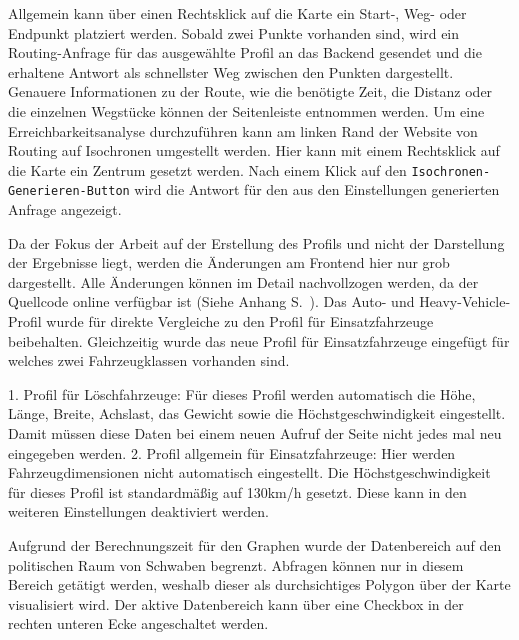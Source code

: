 Allgemein kann über einen Rechtsklick auf die Karte ein Start-, Weg- oder Endpunkt platziert werden.
Sobald zwei Punkte vorhanden sind, wird ein Routing-Anfrage für das ausgewählte Profil an das Backend gesendet und die erhaltene Antwort als schnellster Weg zwischen den Punkten dargestellt.
Genauere Informationen zu der Route, wie die benötigte Zeit, die Distanz oder die einzelnen Wegstücke können der Seitenleiste entnommen werden.
Um eine Erreichbarkeitsanalyse durchzuführen kann am linken Rand der Website von Routing auf Isochronen umgestellt werden.
Hier kann mit einem Rechtsklick auf die Karte ein Zentrum gesetzt werden.
Nach einem Klick auf den \texttt{Isochronen-Generieren-Button} wird die Antwort für den aus den Einstellungen generierten Anfrage angezeigt.

\bigskip

Da der Fokus der Arbeit auf der Erstellung des Profils und nicht der Darstellung der Ergebnisse liegt, werden die Änderungen am Frontend hier nur grob dargestellt.
Alle Änderungen können im Detail nachvollzogen werden, da der Quellcode online verfügbar ist (Siehe Anhang S.~\pageref{sec:anhang}). Das Auto- und Heavy-Vehicle-Profil wurde für direkte Vergleiche zu den Profil für Einsatzfahrzeuge beibehalten.
Gleichzeitig wurde das neue Profil für Einsatzfahrzeuge eingefügt für welches zwei Fahrzeugklassen vorhanden sind.

\bigskip

1. Profil für Löschfahrzeuge: Für dieses Profil werden automatisch die Höhe, Länge, Breite, Achslast, das Gewicht sowie die Höchstgeschwindigkeit eingestellt.
Damit müssen diese Daten bei einem neuen Aufruf der Seite nicht jedes mal neu eingegeben werden.
2. Profil allgemein für Einsatzfahrzeuge: Hier werden Fahrzeugdimensionen nicht automatisch eingestellt.
Die Höchstgeschwindigkeit für dieses Profil ist standardmäßig auf 130km/h gesetzt.
Diese kann in den weiteren Einstellungen deaktiviert werden.

\bigskip

Aufgrund der Berechnungszeit für den Graphen wurde der Datenbereich auf den politischen Raum von Schwaben begrenzt.
Abfragen können nur in diesem Bereich getätigt werden, weshalb dieser als durchsichtiges Polygon über der Karte visualisiert wird.
Der aktive Datenbereich kann über eine Checkbox in der rechten unteren Ecke angeschaltet werden.
